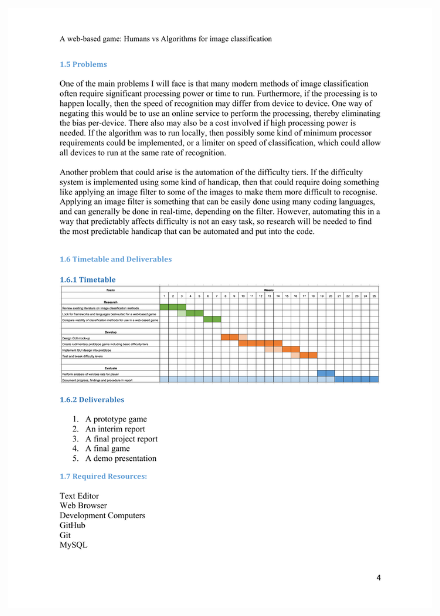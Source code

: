 \documentclass[a4paper,12pt]{report}
\begin{document}
\begin{appendices}
    \begin{figure}[h]
      \centering
      \includegraphics[scale=0.8]{tor-4}
    \end{figure}


\end{appendices}
\end{document}
